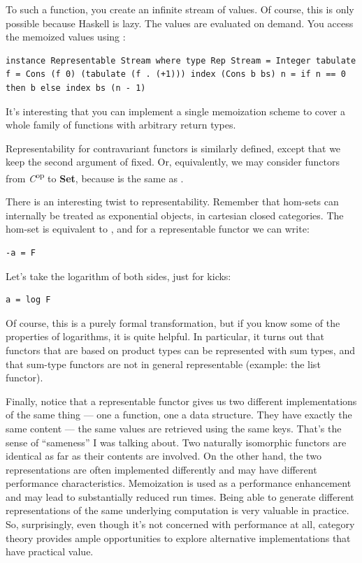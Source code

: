 To  such a function, you create an infinite stream of
values. Of course, this is only possible because Haskell is lazy. The
values are evaluated on demand. You access the memoized values using
:

\begin{verbatim}
instance Representable Stream where type Rep Stream = Integer tabulate f = Cons (f 0) (tabulate (f . (+1))) index (Cons b bs) n = if n == 0 then b else index bs (n - 1)
\end{verbatim}

It's interesting that you can implement a single memoization scheme to
cover a whole family of functions with arbitrary return types.

Representability for contravariant functors is similarly defined, except
that we keep the second argument of  fixed. Or,
equivalently, we may consider functors from \emph{C}\textsuperscript{op}
to \textbf{Set}, because  is the same as
.

There is an interesting twist to representability. Remember that
hom-sets can internally be treated as exponential objects, in cartesian
closed categories. The hom-set  is equivalent to
, and for a representable functor  we can write:

\begin{verbatim}
-a = F
\end{verbatim}

Let's take the logarithm of both sides, just for kicks:

\begin{verbatim}
a = log F
\end{verbatim}

Of course, this is a purely formal transformation, but if you know some
of the properties of logarithms, it is quite helpful. In particular, it
turns out that functors that are based on product types can be
represented with sum types, and that sum-type functors are not in
general representable (example: the list functor).

Finally, notice that a representable functor gives us two different
implementations of the same thing --- one a function, one a data
structure. They have exactly the same content --- the same values are
retrieved using the same keys. That's the sense of ``sameness'' I was
talking about. Two naturally isomorphic functors are identical as far as
their contents are involved. On the other hand, the two representations
are often implemented differently and may have different performance
characteristics. Memoization is used as a performance enhancement and
may lead to substantially reduced run times. Being able to generate
different representations of the same underlying computation is very
valuable in practice. So, surprisingly, even though it's not concerned
with performance at all, category theory provides ample opportunities to
explore alternative implementations that have practical value.

